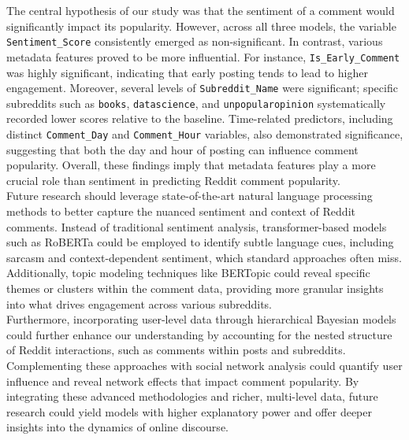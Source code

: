 \documentclass[10pt]{article}
\begin{document}
\noindent The central hypothesis of our study was that the sentiment of a comment would significantly impact its popularity. However, across all three models, the variable \texttt{Sentiment\_Score} consistently emerged as non-significant. In contrast, various metadata features proved to be more influential. For instance, \texttt{Is\_Early\_Comment} was highly significant, indicating that early posting tends to lead to higher engagement. Moreover, several levels of \texttt{Subreddit\_Name} were significant; specific subreddits such as \texttt{books}, \texttt{datascience}, and \texttt{unpopularopinion} systematically recorded lower scores relative to the baseline. Time-related predictors, including distinct \texttt{Comment\_Day} and \texttt{Comment\_Hour} variables, also demonstrated significance, suggesting that both the day and hour of posting can influence comment popularity. Overall, these findings imply that metadata features play a more crucial role than sentiment in predicting Reddit comment popularity. \\

\noindent Future research should leverage state-of-the-art natural language processing methods to better capture the nuanced sentiment and context of Reddit comments. Instead of traditional sentiment analysis, transformer-based models such as RoBERTa could be employed to identify subtle language cues, including sarcasm and context-dependent sentiment, which standard approaches often miss. Additionally, topic modeling techniques like BERTopic could reveal specific themes or clusters within the comment data, providing more granular insights into what drives engagement across various subreddits. \\

\noindent Furthermore, incorporating user-level data through hierarchical Bayesian models could further enhance our understanding by accounting for the nested structure of Reddit interactions, such as comments within posts and subreddits. Complementing these approaches with social network analysis could quantify user influence and reveal network effects that impact comment popularity. By integrating these advanced methodologies and richer, multi-level data, future research could yield models with higher explanatory power and offer deeper insights into the dynamics of online discourse.

\clearpage


\end{document}
